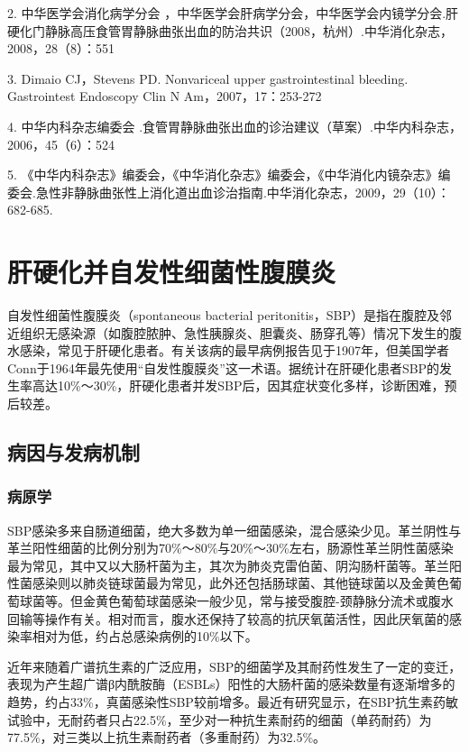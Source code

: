2. 中华医学会消化病学分会
，中华医学会肝病学分会，中华医学会内镜学分会.肝硬化门静脉高压食管胃静脉曲张出血的防治共识（2008，杭州）.中华消化杂志，2008，28（8）：551

3. Dimaio CJ，Stevens PD. Nonvariceal upper gastrointestinal bleeding.
Gastrointest Endoscopy Clin N Am，2007，17：253-272

4. 中华内科杂志编委会
.食管胃静脉曲张出血的诊治建议（草案）.中华内科杂志，2006，45（6）：524

5.
《中华内科杂志》编委会，《中华消化杂志》编委会，《中华消化内镜杂志》编委会.急性非静脉曲张性上消化道出血诊治指南.中华消化杂志，2009，29（10）：682-685.

\protect\hypertarget{text00329.html}{}{}

\section{肝硬化并自发性细菌性腹膜炎}

自发性细菌性腹膜炎（spontaneous bacterial
peritonitis，SBP）是指在腹腔及邻近组织无感染源（如腹腔脓肿、急性胰腺炎、胆囊炎、肠穿孔等）情况下发生的腹水感染，常见于肝硬化患者。有关该病的最早病例报告见于1907年，但美国学者Conn于1964年最先使用“自发性腹膜炎”这一术语。据统计在肝硬化患者SBP的发生率高达10\%～30\%，肝硬化患者并发SBP后，因其症状变化多样，诊断困难，预后较差。

\subsection{病因与发病机制}

\subsubsection{病原学}

SBP感染多来自肠道细菌，绝大多数为单一细菌感染，混合感染少见。革兰阴性与革兰阳性细菌的比例分别为70\%～80\%与20\%～30\%左右，肠源性革兰阴性菌感染最为常见，其中又以大肠杆菌为主，其次为肺炎克雷伯菌、阴沟肠杆菌等。革兰阳性菌感染则以肺炎链球菌最为常见，此外还包括肠球菌、其他链球菌以及金黄色葡萄球菌等。但金黄色葡萄球菌感染一般少见，常与接受腹腔-颈静脉分流术或腹水回输等操作有关。相对而言，腹水还保持了较高的抗厌氧菌活性，因此厌氧菌的感染率相对为低，约占总感染病例的10\%以下。

近年来随着广谱抗生素的广泛应用，SBP的细菌学及其耐药性发生了一定的变迁，表现为产生超广谱β内酰胺酶（ESBLs）阳性的大肠杆菌的感染数量有逐渐增多的趋势，约占33\%，真菌感染性SBP较前增多。最近有研究显示，在SBP抗生素药敏试验中，无耐药者只占22.5\%，至少对一种抗生素耐药的细菌（单药耐药）为77.5\%，对三类以上抗生素耐药者（多重耐药）为32.5\%。

